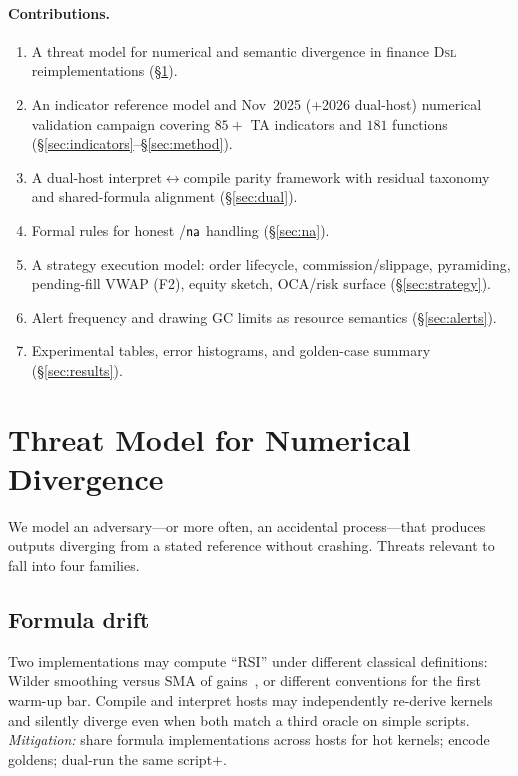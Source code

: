 \documentclass[11pt,a4paper]{article}
\begin{document}
\paragraph{Contributions.}
\begin{enumerate}[leftmargin=*]
  \item A threat model for numerical and semantic divergence in finance
    \textsc{Dsl} reimplementations (\S\ref{sec:threat}).
  \item An indicator reference model and Nov~2025 (+2026 dual-host) numerical
    validation campaign covering $85+$ TA indicators and $181$ functions
    (\S\ref{sec:indicators}--\S\ref{sec:method}).
  \item A dual-host interpret$\leftrightarrow$compile parity framework with
    residual taxonomy and shared-formula alignment (\S\ref{sec:dual}).
  \item Formal rules for honest /$\textsf{na}$ handling
    (\S\ref{sec:na}).
  \item A strategy execution model: order lifecycle, commission/slippage,
    pyramiding, pending-fill VWAP (F2), equity sketch, OCA/risk surface
    (\S\ref{sec:strategy}).
  \item Alert frequency and drawing GC limits as resource semantics
    (\S\ref{sec:alerts}).
  \item Experimental tables, error histograms, and golden-case summary
    (\S\ref{sec:results}).
\end{enumerate}

\section{Threat Model for Numerical Divergence}
\label{sec:threat}

We model an adversary---or more often, an accidental process---that produces
outputs diverging from a stated reference without crashing.
Threats relevant to \pyne{} fall into four families.

\subsection{Formula drift}
\label{sec:threat-formula}
Two implementations may compute ``RSI'' under different classical definitions:
Wilder smoothing versus SMA of gains~\citep{wilder1978new,murphy1999technical},
or different conventions for the first warm-up bar.
Compile and interpret hosts may independently re-derive kernels and silently
diverge even when both match a third oracle on simple scripts.
\emph{Mitigation:} share formula implementations across hosts for hot kernels;
encode goldens; dual-run the same script+\ohlcv{}.
\end{document}
